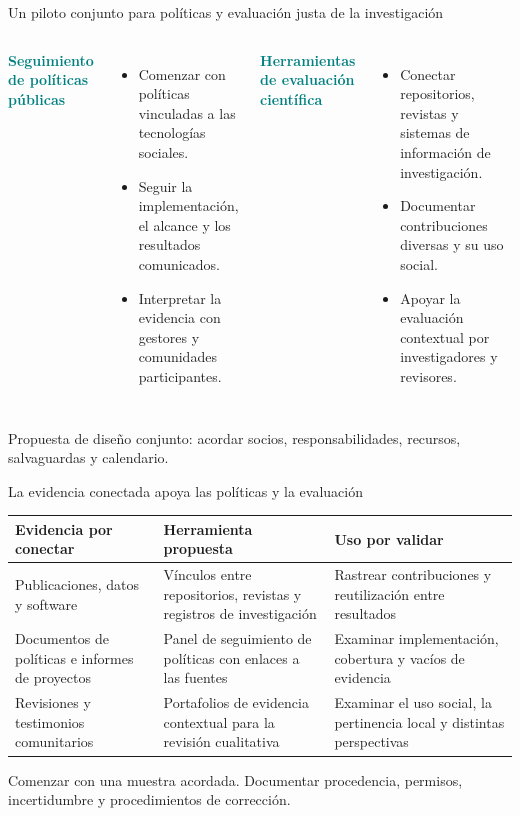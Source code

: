 \documentclass[aspectratio=169,11pt]{beamer}
\newcommand{\tagline}[1]{\textcolor{Teal}{\bfseries\small#1}}
\begin{document}
\begin{frame}{Un piloto conjunto para políticas y evaluación justa de la investigación}
\begin{columns}[T,onlytextwidth]\tagline{Seguimiento de políticas públicas}\par\vspace{.20cm}
\begin{itemize}\setlength\itemsep{.22cm}
\item Comenzar con políticas vinculadas a las tecnologías sociales.
\item Seguir la implementación, el alcance y los resultados comunicados.
\item Interpretar la evidencia con gestores y comunidades participantes.
\end{itemize}
\tagline{Herramientas de evaluación científica}\par\vspace{.20cm}
\begin{itemize}\setlength\itemsep{.22cm}
\item Conectar repositorios, revistas y sistemas de información de investigación.
\item Documentar contribuciones diversas y su uso social.
\item Apoyar la evaluación contextual por investigadores y revisores.
\end{itemize}
\end{columns}
\vfill
\begin{center}\small Propuesta de diseño conjunto: acordar socios, responsabilidades, recursos, salvaguardas y calendario.\end{center}
\end{frame}

\begin{frame}{La evidencia conectada apoya las políticas y la evaluación}
\small\begin{tabular}{@{}>{\raggedright\arraybackslash}p{3.4cm}>{\raggedright\arraybackslash}p{4.6cm}>{\raggedright\arraybackslash}p{4.6cm}@{}}\toprule\textbf{Evidencia por conectar} & \textbf{Herramienta propuesta} & \textbf{Uso por validar}\\\midrule Publicaciones, datos y software & Vínculos entre repositorios, revistas y registros de investigación & Rastrear contribuciones y reutilización entre resultados\\\addlinespace[.25cm]Documentos de políticas e informes de proyectos & Panel de seguimiento de políticas con enlaces a las fuentes & Examinar implementación, cobertura y vacíos de evidencia\\\addlinespace[.25cm]Revisiones y testimonios comunitarios & Portafolios de evidencia contextual para la revisión cualitativa & Examinar el uso social, la pertinencia local y distintas perspectivas\\\bottomrule\end{tabular}\vfill\begin{center}\small Comenzar con una muestra acordada. Documentar procedencia, permisos, incertidumbre y procedimientos de corrección.\end{center}
\end{frame}
\end{document}
